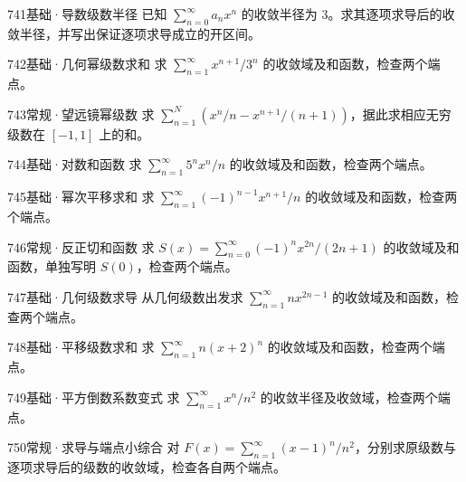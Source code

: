 \begin{exercise}{741}{基础·导数级数半径}
已知 $\sum_{n=0}^{\infty}a_nx^n$ 的收敛半径为 $3$。求其逐项求导后的收敛半径，并写出保证逐项求导成立的开区间。
\end{exercise}
\begin{exercise}{742}{基础·几何幂级数求和}
求 $\sum_{n=1}^{\infty}x^{n+1}/3^n$ 的收敛域及和函数，检查两个端点。
\end{exercise}
\begin{exercise}{743}{常规·望远镜幂级数}
求 $\sum_{n=1}^N(x^n/n-x^{n+1}/(n+1))$，据此求相应无穷级数在 $[-1,1]$ 上的和。
\end{exercise}
\begin{exercise}{744}{基础·对数和函数}
求 $\sum_{n=1}^{\infty}5^nx^n/n$ 的收敛域及和函数，检查两个端点。
\end{exercise}
\begin{exercise}{745}{基础·幂次平移求和}
求 $\sum_{n=1}^{\infty}(-1)^{n-1}x^{n+1}/n$ 的收敛域及和函数，检查两个端点。
\end{exercise}
\begin{exercise}{746}{常规·反正切和函数}
求 $S(x)=\sum_{n=0}^{\infty}(-1)^nx^{2n}/(2n+1)$ 的收敛域及和函数，单独写明 $S(0)$，检查两个端点。
\end{exercise}
\begin{exercise}{747}{基础·几何级数求导}
从几何级数出发求 $\sum_{n=1}^{\infty}nx^{2n-1}$ 的收敛域及和函数，检查两个端点。
\end{exercise}
\begin{exercise}{748}{基础·平移级数求和}
求 $\sum_{n=1}^{\infty}n(x+2)^n$ 的收敛域及和函数，检查两个端点。
\end{exercise}
\begin{exercise}{749}{基础·平方倒数系数变式}
求 $\sum_{n=1}^{\infty}x^n/n^2$ 的收敛半径及收敛域，检查两个端点。
\end{exercise}
\begin{exercise}{750}{常规·求导与端点小综合}
对 $F(x)=\sum_{n=1}^{\infty}(x-1)^n/n^2$，分别求原级数与逐项求导后的级数的收敛域，检查各自两个端点。
\end{exercise}
